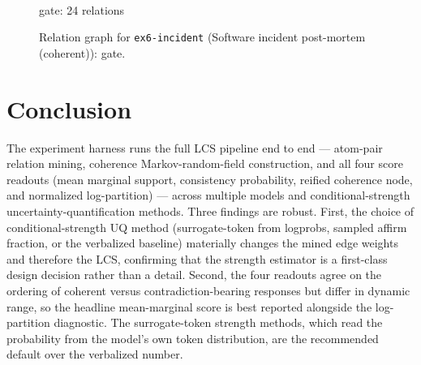 \documentclass[11pt]{article}
\begin{document}
\begin{figure}[htbp]
\begin{minipage}[t]{0.48\linewidth}
{
}
\\[2pt]{\footnotesize gate: 24 relations}
\end{minipage}
\caption{Relation graph for \texttt{ex6-incident} (Software incident post-mortem (coherent)): gate.}
\label{fig:graph-example-6-incident}
\end{figure}

\section{Conclusion}

The experiment harness runs the full LCS pipeline end to end --- atom-pair
relation mining, coherence Markov-random-field construction, and all four score
readouts (mean marginal support, consistency probability, reified coherence node,
and normalized log-partition) --- across multiple models and conditional-strength
uncertainty-quantification methods. Three findings are robust. First, the choice
of conditional-strength UQ method (surrogate-token from logprobs, sampled affirm
fraction, or the verbalized baseline) materially changes the mined edge weights
and therefore the LCS, confirming that the strength estimator is a first-class
design decision rather than a detail. Second, the four readouts agree on the
ordering of coherent versus contradiction-bearing responses but differ in dynamic
range, so the headline mean-marginal score is best reported alongside the
log-partition diagnostic. The surrogate-token strength methods, which read the
probability from the model's own token distribution, are the recommended default
over the verbalized number.
\end{document}
